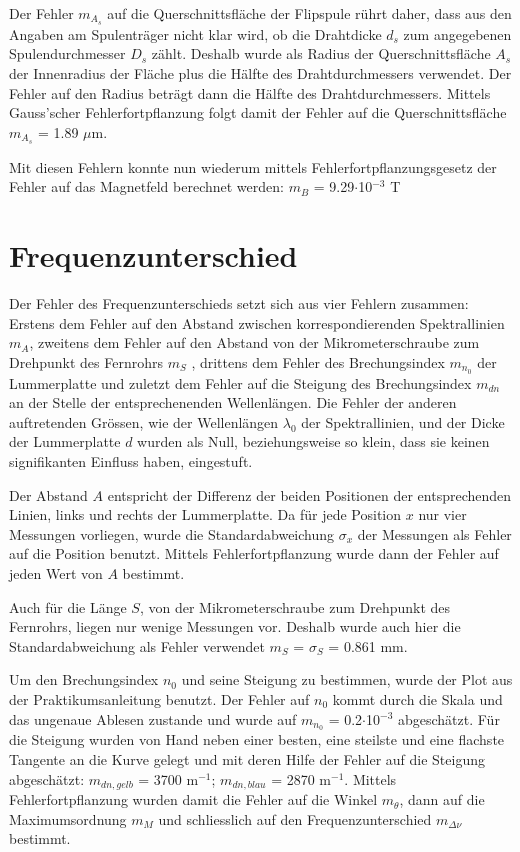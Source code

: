 \documentclass[a4paper,parskip,11pt, DIV12]{scrreprt}
\begin{document}
	Der Fehler $m_{A_s}$ auf die Querschnittsfläche der Flipspule rührt daher, dass aus den Angaben am Spulenträger nicht klar wird, ob die Drahtdicke $d_s$ zum angegebenen Spulendurchmesser $D_s$ zählt. Deshalb wurde als Radius der Querschnittsfläche $A_s$ der Innenradius der Fläche plus die Hälfte des Drahtdurchmessers verwendet. Der Fehler auf den Radius beträgt dann die Hälfte des Drahtdurchmessers. Mittels Gauss'scher Fehlerfortpflanzung folgt damit der Fehler auf die Querschnittsfläche $m_{A_s}$ = 1.89 $\mu$m. 
	
	Mit diesen Fehlern konnte nun wiederum mittels Fehlerfortpflanzungsgesetz der Fehler auf das Magnetfeld berechnet werden: $m_B$ = 9.29$\cdot $10$^{-3}$ T
	 
	\section{Frequenzunterschied}
	Der Fehler des Frequenzunterschieds setzt sich aus vier Fehlern zusammen: Erstens dem Fehler auf den Abstand zwischen korrespondierenden Spektrallinien $m_A$, zweitens dem Fehler auf den Abstand von der Mikrometerschraube zum Drehpunkt des Fernrohrs $m_S$ , drittens dem Fehler des Brechungsindex $m_{n_0}$ der Lummerplatte und zuletzt dem Fehler auf die Steigung des Brechungsindex $m_{dn}$ an der Stelle der entsprechenenden Wellenlängen. Die Fehler der anderen auftretenden Grössen, wie der Wellenlängen $\lambda_0$ der Spektrallinien, und der Dicke der Lummerplatte $d$  wurden als Null, beziehungsweise so klein, dass sie keinen signifikanten Einfluss haben, eingestuft. 
	
	Der Abstand $A$ entspricht der Differenz der beiden Positionen der entsprechenden Linien, links und rechts der Lummerplatte. Da für jede Position $x$ nur vier Messungen vorliegen, wurde die Standardabweichung $\sigma_x$ der Messungen als Fehler auf die Position benutzt. Mittels Fehlerfortpflanzung wurde dann der Fehler auf jeden Wert von $A$ bestimmt.
	
	Auch für die Länge $S$, von der Mikrometerschraube zum Drehpunkt des Fernrohrs, liegen nur wenige Messungen vor. Deshalb wurde auch hier die Standardabweichung als Fehler verwendet $m_S$ = $\sigma_S$ = 0.861 mm.
	
	Um den Brechungsindex $n_0$ und seine Steigung zu bestimmen, wurde der Plot aus der Praktikumsanleitung benutzt. Der Fehler auf $n_0$ kommt durch die Skala und das ungenaue Ablesen zustande und wurde auf $m_{n_0}$ = 0.2$\cdot$10$^{-3}$ abgeschätzt.
Für die Steigung wurden von Hand neben einer besten, eine steilste und eine flachste Tangente an die Kurve gelegt und mit deren Hilfe der Fehler auf die Steigung abgeschätzt: $m_{dn,gelb}$ = 3700 m$^{-1}$; $m_{dn,blau}$ = 2870 m$^{-1}$.
	Mittels Fehlerfortpflanzung wurden damit die Fehler auf die Winkel $m_{\theta}$, dann auf die Maximumsordnung $m_M$ und schliesslich auf den Frequenzunterschied $m_{\Delta \nu}$ bestimmt.
	\clearpage
	
\end{document}
